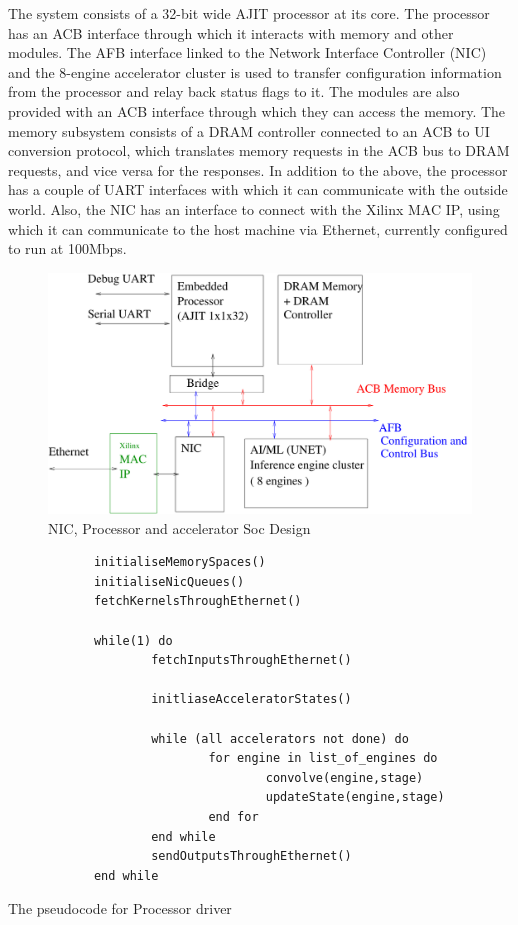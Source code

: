 \documentclass[12pt]{report}
\begin{document}
The system consists of a 32-bit wide AJIT processor at its core. The processor has an ACB interface through which it interacts with memory and other modules. The AFB interface linked to the Network Interface Controller (NIC) and the 8-engine accelerator cluster is used to transfer configuration information from the processor and relay back status flags to it. The modules are also provided with an ACB interface through which they can access the memory. The memory subsystem consists of a DRAM controller connected to an ACB to UI conversion protocol, which translates memory requests in the ACB bus to DRAM requests, and vice versa for the responses. In addition to the above, the processor has a couple of UART interfaces with which it can communicate with the outside world. Also, the NIC has an interface to connect with the Xilinx MAC IP, using which it can communicate to the host machine via Ethernet, currently configured to run at 100Mbps. 
\\


		\begin{figure}[htbp]
			\centering
			\includegraphics[width=12cm]{./figures/BlockDiagram.pdf}
			\caption{NIC, Processor and accelerator Soc Design}
			\label{fig:SoC}
		\end{figure}

\begin{algorithm}
	\centering
	\begin{verbatim}
	        initialiseMemorySpaces()
	        initialiseNicQueues()
	        fetchKernelsThroughEthernet()
	
	        while(1) do
	                fetchInputsThroughEthernet()
			
	                initliaseAcceleratorStates()
			
	                while (all accelerators not done) do
	                        for engine in list_of_engines do
	                                convolve(engine,stage)
	                                updateState(engine,stage)
	                        end for
	                end while
	                sendOutputsThroughEthernet()
	        end while
	\end{verbatim}
	\caption{The pseudocode for Processor driver}
	\label{alg:ProcAlg}
\end{algorithm}
\end{document}
